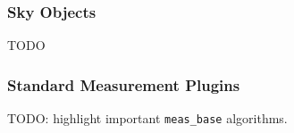 \subsubsection{Sky Objects}

\label{sec:sky-objects}

TODO

\subsubsection{Standard Measurement Plugins}

TODO: highlight important \texttt{meas\_base} algorithms.








